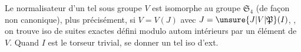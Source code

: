 Le normalisateur d'un tel  sous groupe $V$  est isomorphe au groupe  $\mathfrak S_4$ (de façon non canonique), plus précisément, si $V=V(J)$ avec $J=\unsure{J|V|\mathfrak P}(I)$, , on trouve  iso de suites exactes
défini modulo autom intérieurs par un élément de $V$. Quand $I$ est le torseur trivial, se donner un tel  iso d'ext.

